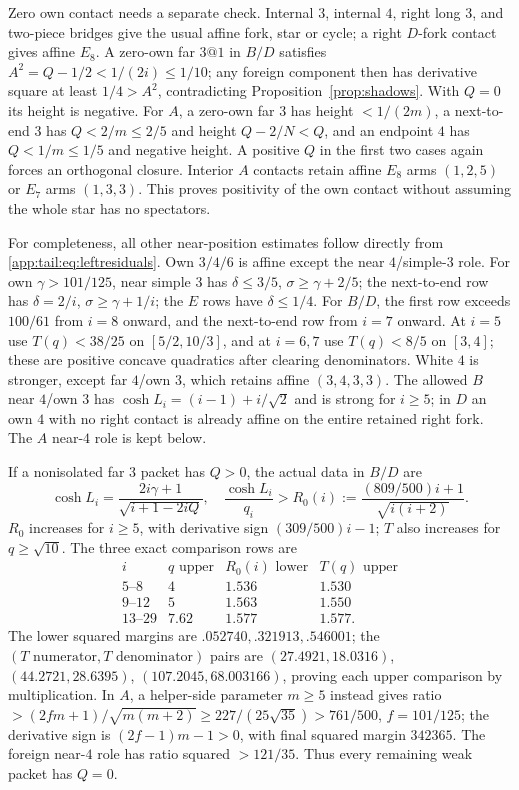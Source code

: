 \documentclass[11pt]{article}
\theoremstyle{definition}
\theoremstyle{remark}
\begin{document}
Zero own contact needs a separate check. Internal $3$, internal $4$,
right long $3$, and two-piece bridges give the usual affine fork,
star or cycle; a right $D$-fork contact gives affine $E_8$.
A zero-own far $3@1$ in $B/D$ satisfies
$A^2=Q-1/2<1/(2i)\le1/10$; any foreign component then has
derivative square at least $1/4>A^2$, contradicting
Proposition~\ref{prop:shadows}. With $Q=0$ its height is negative.
For $A$, a zero-own far $3$ has height $<1/(2m)$, a next-to-end
$3$ has $Q<2/m\le2/5$ and height $Q-2/N<Q$, and an endpoint
$4$ has $Q<1/m\le1/5$ and negative height. A positive $Q$ in
the first two cases again forces an orthogonal closure. Interior
$A$ contacts retain affine $E_8$ arms $(1,2,5)$ or $E_7$ arms
$(1,3,3)$. This proves positivity of the own contact without
assuming the whole star has no spectators.

For completeness, all other near-position estimates follow directly
from \eqref{app:tail:eq:leftresiduals}. Own $3/4/6$ is affine except the
near $4$/simple-$3$ role. For own $\gamma>101/125$, near simple
$3$ has $\delta\le3/5$, $\sigma\ge\gamma+2/5$;
the next-to-end row has $\delta=2/i$, $\sigma\ge\gamma+1/i$;
the $E$ rows have $\delta\le1/4$.
For $B/D$, the first row exceeds $100/61$ from $i=8$ onward,
and the next-to-end row from $i=7$ onward. At $i=5$ use
$T(q)<38/25$ on $[5/2,10/3]$, and at $i=6,7$ use
$T(q)<8/5$ on $[3,4]$; these are positive concave quadratics
after clearing denominators. White $4$ is stronger, except far
$4$/own $3$, which retains affine $(3,4,3,3)$.
The allowed $B$ near $4$/own $3$ has
$\cosh L_i=(i-1)+i/\sqrt2$ and is strong for $i\ge5$;
in $D$ an own $4$ with no right contact is already affine on the
entire retained right fork. The $A$ near-$4$ role is kept below.

If a nonisolated far $3$ packet has $Q>0$, the actual data in $B/D$ are
\[
 \cosh L_i=\frac{2i\gamma+1}{\sqrt{i+1-2iQ}},\quad
 \frac{\cosh L_i}{q_i}>R_0(i)
 :=\frac{(809/500)i+1}{\sqrt{i(i+2)}}.
\]
$R_0$ increases for $i\ge5$, with derivative sign
$(309/500)i-1$; $T$ also increases for $q\ge\sqrt{10}$.
The three exact comparison rows are
\[
\begin{array}{c|c|c|c}
i&q\text{ upper}&R_0(i)\text{ lower}&T(q)\text{ upper}\\ \hline
5\text{--}8&4&1.536&1.530\\
9\text{--}12&5&1.563&1.550\\
13\text{--}29&7.62&1.577&1.577.
\end{array}
\]
The lower squared margins are $.052740,.321913,.546001$;
the $(T\text{ numerator},T\text{ denominator})$ pairs are
$(27.4921,18.0316)$, $(44.2721,28.6395)$,
$(107.2045,68.003166)$, proving each upper comparison by
multiplication. In $A$, a helper-side parameter $m\ge5$ instead
gives ratio $>(2fm+1)/\sqrt{m(m+2)}\ge227/(25\sqrt{35})>
761/500$, $f=101/125$; the derivative sign is
$(2f-1)m-1>0$, with final squared margin $342365$.
The foreign near-$4$ role has ratio squared $>121/35$.
Thus every remaining weak packet has $Q=0$.
\end{document}
